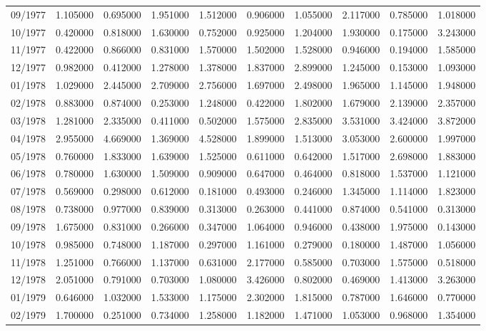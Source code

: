 \begin{tabular}{lrrrrrrrrr}
09/1977 & 1.105000 & 0.695000 & 1.951000 & 1.512000 & 0.906000 & 1.055000 & 2.117000 & 0.785000 & 1.018000 \\
10/1977 & 0.420000 & 0.818000 & 1.630000 & 0.752000 & 0.925000 & 1.204000 & 1.930000 & 0.175000 & 3.243000 \\
11/1977 & 0.422000 & 0.866000 & 0.831000 & 1.570000 & 1.502000 & 1.528000 & 0.946000 & 0.194000 & 1.585000 \\
12/1977 & 0.982000 & 0.412000 & 1.278000 & 1.378000 & 1.837000 & 2.899000 & 1.245000 & 0.153000 & 1.093000 \\
01/1978 & 1.029000 & 2.445000 & 2.709000 & 2.756000 & 1.697000 & 2.498000 & 1.965000 & 1.145000 & 1.948000 \\
02/1978 & 0.883000 & 0.874000 & 0.253000 & 1.248000 & 0.422000 & 1.802000 & 1.679000 & 2.139000 & 2.357000 \\
03/1978 & 1.281000 & 2.335000 & 0.411000 & 0.502000 & 1.575000 & 2.835000 & 3.531000 & 3.424000 & 3.872000 \\
04/1978 & 2.955000 & 4.669000 & 1.369000 & 4.528000 & 1.899000 & 1.513000 & 3.053000 & 2.600000 & 1.997000 \\
05/1978 & 0.760000 & 1.833000 & 1.639000 & 1.525000 & 0.611000 & 0.642000 & 1.517000 & 2.698000 & 1.883000 \\
06/1978 & 0.780000 & 1.630000 & 1.509000 & 0.909000 & 0.647000 & 0.464000 & 0.818000 & 1.537000 & 1.121000 \\
07/1978 & 0.569000 & 0.298000 & 0.612000 & 0.181000 & 0.493000 & 0.246000 & 1.345000 & 1.114000 & 1.823000 \\
08/1978 & 0.738000 & 0.977000 & 0.839000 & 0.313000 & 0.263000 & 0.441000 & 0.874000 & 0.541000 & 0.313000 \\
09/1978 & 1.675000 & 0.831000 & 0.266000 & 0.347000 & 1.064000 & 0.946000 & 0.438000 & 1.975000 & 0.143000 \\
10/1978 & 0.985000 & 0.748000 & 1.187000 & 0.297000 & 1.161000 & 0.279000 & 0.180000 & 1.487000 & 1.056000 \\
11/1978 & 1.251000 & 0.766000 & 1.137000 & 0.631000 & 2.177000 & 0.585000 & 0.703000 & 1.575000 & 0.518000 \\
12/1978 & 2.051000 & 0.791000 & 0.703000 & 1.080000 & 3.426000 & 0.802000 & 0.469000 & 1.413000 & 3.263000 \\
01/1979 & 0.646000 & 1.032000 & 1.533000 & 1.175000 & 2.302000 & 1.815000 & 0.787000 & 1.646000 & 0.770000 \\
02/1979 & 1.700000 & 0.251000 & 0.734000 & 1.258000 & 1.182000 & 1.471000 & 1.053000 & 0.968000 & 1.354000 \\

\end{tabular}

